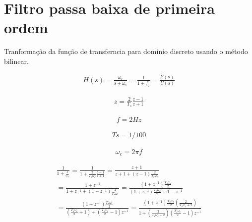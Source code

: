 

\chapter{Filtro passa baixa de primeira ordem}

Tranformação da função de transferncia para domínio discreto usando o método bilinear.

\begin{equation}
    \begin{split}
        H\left( s \right) = \frac{\omega_c}{s + \omega_c} = 
        \frac{1}{1 + \frac{s}{\omega_c}}
        =  \frac{Y \left( s \right)}{ U \left( s \right)}
    \end{split}
\end{equation}

\begin{equation}
    \begin{split}
        z = \frac{2}{T_s}\frac{z-1}{z+1}
    \end{split}
\end{equation}

\begin{equation}
    \begin{split}
        f=2Hz
    \end{split}
\end{equation}

\begin{equation}
    \begin{split}
        Ts=1/100
    \end{split}
\end{equation}

\begin{equation}
    \begin{split}
        \omega_c = 2 \pi f
    \end{split}
\end{equation}


\begin{equation*}
    \begin{split}
        \frac{1}{1 + \frac{s}{\omega_c}}
        = \frac{1}{1 + \frac{2}{T_s\omega_c}\frac{z-1}{z+1}} 
        = \frac{z + 1}{z + 1 + \left( z-1 \right) \frac{2}{T_s\omega_c}} \\
        = \frac{1 + z^{-1}}{1 + z^{-1} + \left( 1 - z^{-1} \right) \frac{2}{T_s\omega_c}}
        = \frac{\left(1 + z^{-1} \right) \frac{T_s\omega_c}{2} }{\left(1 + z^{-1} \right) \frac{T_s\omega_c}{2} +  1 - z^{-1} } \\
        = \frac{\left(1 + z^{-1} \right) \frac{T_s\omega_c}{2} }
        { \left(\frac{T_s\omega_c}{2} + 1 \right) + \left(\frac{T_s\omega_c}{2} - 1 \right) z^{-1} }
        = \frac{\left(1 + z^{-1} \right) \frac{T_s\omega_c}{2} \left( \frac{2}{T_s\omega_c + 2} \right) }
        { 1 + \left( \frac{2}{T_s\omega_c + 2} \right) \left(\frac{T_s\omega_c}{2} - 1 \right) z^{-1} }
    \end{split}
\end{equation*}


